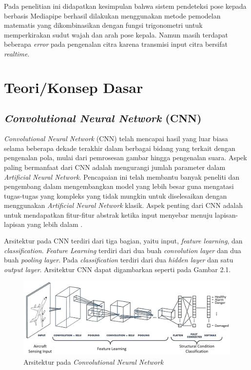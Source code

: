 Pada penelitian ini didapatkan kesimpulan bahwa sistem pendeteksi pose kepada berbasis Mediapipe berhasil dilakukan menggunakan metode pemodelan matematis yang dikombinasikan dengan fungsi trigonometri untuk memperkirakan sudut wajah dan arah pose kepala. Namun masih terdapat beberapa \emph{error} pada pengenalan citra karena transmisi input citra bersifat \emph{realtime}.

\section{Teori/Konsep Dasar}

\subsection{\emph{Convolutional Neural Network} (CNN)}

\emph{Convolutional Neural Network} (CNN) telah mencapai hasil yang luar biasa selama beberapa dekade terakhir dalam berbagai bidang yang terkait dengan pengenalan pola, mulai dari pemrosesan gambar hingga pengenalan suara. Aspek paling bermanfaat dari CNN adalah mengurangi jumlah parameter dalam \emph{Artificial Neural Network}. Pencapaian ini telah membantu banyak peneliti dan pengembang dalam mengembangkan model yang lebih besar guna mengatasi tugas-tugas yang kompleks yang tidak mungkin untuk diselesaikan dengan menggunakan \emph{Artificial Neural Network} klasik. Aspek penting dari CNN adalah untuk mendapatkan fitur-fitur abstrak ketika input menyebar menuju lapisan-lapisan yang lebih dalam \parencite{8308186}.

Arsitektur pada CNN terdiri dari tiga bagian, yaitu input, \emph{feature learning}, dan \emph{classification}. \emph{Feature Learning} terdiri dari dua buah \emph{convolution layer} dan dua buah \emph{pooling layer}. Pada \emph{classification} terdiri dari dua \emph{hidden layer} dan satu \emph{output layer}. Arsitektur CNN dapat digambarkan seperti pada Gambar 2.1.

\begin{figure} [ht] \centering
    \includegraphics[scale=0.12]{gambar/arsitekturcnn.png}
    \caption{Arsitektur pada \emph{Convolutional Neural Network}}
    \label{fig:arsitektur cnn}
\end{figure}

